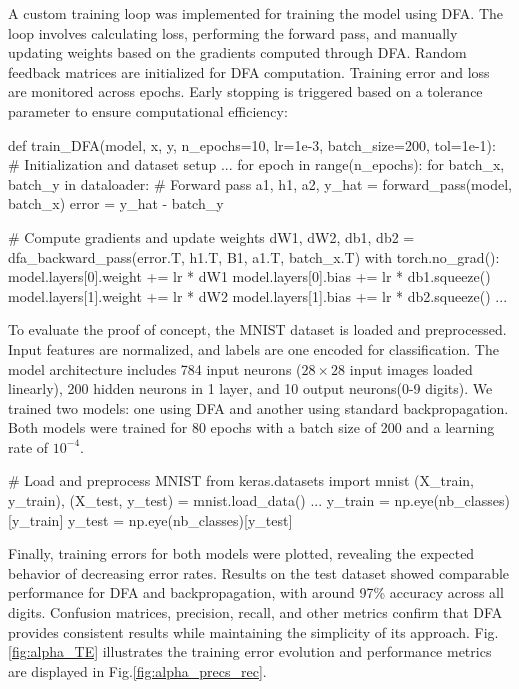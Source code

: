\documentclass[english]{article}
\begin{document}
A custom training loop was implemented for training the model using DFA. The loop involves calculating loss, performing the forward pass, and manually updating weights based on the gradients computed through DFA. Random feedback matrices are initialized for DFA computation. Training error and loss are monitored across epochs. Early stopping is triggered based on a tolerance parameter to ensure computational efficiency:

\begin{python}
def train_DFA(model, x, y, n_epochs=10, lr=1e-3, batch_size=200, tol=1e-1):
    # Initialization and dataset setup
    ...
    for epoch in range(n_epochs):
        for batch_x, batch_y in dataloader:
            # Forward pass
            a1, h1, a2, y_hat = forward_pass(model, batch_x)
            error = y_hat - batch_y

            # Compute gradients and update weights
            dW1, dW2, db1, db2 = dfa_backward_pass(error.T, h1.T, B1, a1.T, batch_x.T)
            with torch.no_grad():
                model.layers[0].weight += lr * dW1
                model.layers[0].bias += lr * db1.squeeze()
                model.layers[1].weight += lr * dW2
                model.layers[1].bias += lr * db2.squeeze()
        ...
\end{python}

To evaluate the proof of concept, the MNIST dataset is loaded and preprocessed. Input features are normalized, and labels are one encoded for classification. The model architecture includes 784 input neurons ($28\times28$ input images loaded linearly), 200 hidden neurons in 1 layer, and 10 output neurons(0-9 digits). We trained two models: one using DFA and another using standard backpropagation. Both models were trained for 80 epochs with a batch size of 200 and a learning rate of \(10^{-4}\).

\begin{python}
# Load and preprocess MNIST
from keras.datasets import mnist
(X_train, y_train), (X_test, y_test) = mnist.load_data()
...
y_train = np.eye(nb_classes)[y_train]
y_test = np.eye(nb_classes)[y_test]
\end{python}

Finally, training errors for both models were plotted, revealing the expected behavior of decreasing error rates. Results on the test dataset showed comparable performance for DFA and backpropagation, with around 97\% accuracy across all digits. Confusion matrices, precision, recall, and other metrics confirm that DFA provides consistent results while maintaining the simplicity of its approach. Fig.\ref{fig:alpha_TE} illustrates the training error evolution and performance metrics are displayed in Fig.\ref{fig:alpha_precs_rec}. 
\end{document}
